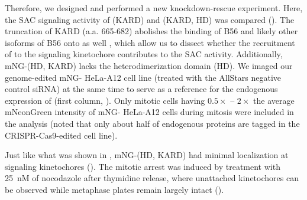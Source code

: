 Therefore, we designed and performed a new  knockdown-rescue experiment. Here, the SAC signaling activity of (\textDelta{}KARD) and (\textDelta{}KARD, \textDelta{}HD) was compared (). The truncation of KARD (a.a. 665-682) abolishes the binding of B56\textalpha{} \cite{Suijkerbuijk2012} and likely other isoforms of B56 onto  as well \cite{B56-SLiM, PP2A-B56-BUBR1Structure}, which allow us to dissect whether the recruitment of  to the signaling kinetochore  contributes to the SAC activity. Additionally, mNG-(\textDelta{}HD, \textDelta{}KARD) lacks the heterodimerization domain (HD). We imaged our genome-edited mNG- HeLa-A12 cell line (treated with the AllStars negative control siRNA) at the same time to serve as a reference for the endogenous expression of  (first column, ). Only mitotic cells having $0.5\times$ -- $2\times$ the average mNeonGreen intensity of mNG- HeLa-A12 cells during mitosis were included in the analysis (noted that only about half of endogenous  proteins are tagged in the CRISPR-Cas9-edited cell line).

Just like what was shown in \cite{BubBiochem}, mNG-(\textDelta{}HD, \textDelta{}KARD) had minimal localization at signaling kinetochores  (). The mitotic arrest was induced by treatment with \SI{25}{nM} of nocodazole \cite{25nMNoc} after thymidine release, where unattached kinetochores can be observed while metaphase plates remain largely intact ().

